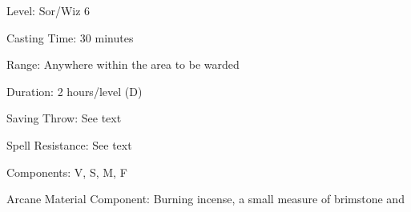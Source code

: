 
\begin{description*}
\item[Level:] Sor/Wiz 6
\item[Casting Time:] 30 minutes
\item[Range:] Anywhere within the area to be warded
\item[Duration:] 2 hours/level (D)
\item[Saving Throw:] See text
\item[Spell Resistance:] See text
\item[Components:] V, S, M, F
\item[Arcane Material Component:] Burning incense, a small measure of brimstone and
\end{description*}

